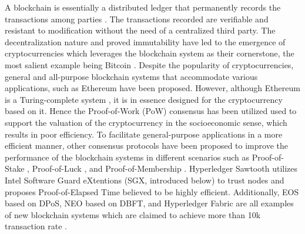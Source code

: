 %

A blockchain is essentially a distributed ledger that permanently records the transactions among parties \cite{iansiti2018truth}. The transactions recorded are verifiable and resistant to modification without the need of a centralized third party. The decentralization nature and proved immutability have led to the emergence of cryptocurrencies which leverages the blockchain system as their cornerstone, the most salient example being Bitcoin \cite{nakamoto2008bitcoin}. Despite the popularity of cryptocurrencies, general and all-purpose blockchain systems that accommodate various applications, such as Ethereum \cite{wood2014ethereum} have been proposed. However, although Ethereum is a Turing-complete system \cite{wood2014ethereum}, it is in essence designed for the cryptocurrency based on it. Hence the Proof-of-Work (PoW) consensus has been utilized used to support the valuation of the cryptocurrency in the socioeconomic sense, which results in poor efficiency. To facilitate general-purpose applications in a more efficient manner, other consensus protocols have been proposed to improve the performance of the blockchain systems in different scenarios such as Proof-of-Stake \cite{kiayias2017ouroboros}, Proof-of-Luck \cite{milutinovic2016proof}, and Proof-of-Membership \cite{kogias2016enhancing}. Hyperledger Sawtooth \cite{sawtooth} utilizes Intel Software Guard eXtentions (SGX, introduced below) to trust nodes and proposes Proof-of-Elapsed Time believed to be highly efficient. Additionally, EOS \cite{eosio} based on DPoS, NEO \cite{hoxha2018hashgraph} based on DBFT, and Hyperledger Fabric \cite{cachin2016architecture} are all examples of new blockchain systems which are claimed to achieve more than 10k transaction rate \cite{bach2018comparative}.

